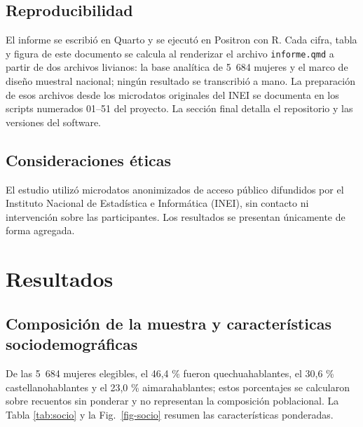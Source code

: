 \documentclass[
  spanish,
  letterpaper,
  conference]{IEEEtran}
\begin{document}
\subsection{Reproducibilidad}\label{reproducibilidad}

El informe se escribió en Quarto \citep{quarto} y se ejecutó en Positron
con R. Cada cifra, tabla y figura de este documento se calcula al
renderizar el archivo \texttt{informe.qmd} a partir de dos archivos
livianos: la base analítica de 5~684 mujeres y el marco de diseño
muestral nacional; ningún resultado se transcribió a mano. La
preparación de esos archivos desde los microdatos originales del INEI se
documenta en los scripts numerados 01--51 del proyecto. La sección final
detalla el repositorio y las versiones del software.

\subsection{Consideraciones éticas}\label{consideraciones-uxe9ticas}

El estudio utilizó microdatos anonimizados de acceso público difundidos
por el Instituto Nacional de Estadística e Informática (INEI), sin
contacto ni intervención sobre las participantes. Los resultados se
presentan únicamente de forma agregada.

\section{Resultados}\label{resultados}

\subsection{Composición de la muestra y características
sociodemográficas}\label{composiciuxf3n-de-la-muestra-y-caracteruxedsticas-sociodemogruxe1ficas}

De las 5~684 mujeres elegibles, el 46,4 \% fueron quechuahablantes, el
30,6 \% castellanohablantes y el 23,0 \% aimarahablantes; estos
porcentajes se calcularon sobre recuentos sin ponderar y no representan
la composición poblacional. La Tabla \ref{tab:socio} y la
Fig.~\ref{fig-socio} resumen las características ponderadas.
\end{document}
